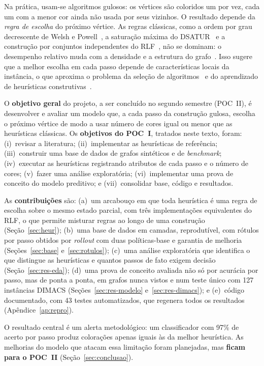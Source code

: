 \documentclass[conference,a4paper]{IEEEtran}
\begin{document}
Na prática, usam-se algoritmos gulosos: os vértices são coloridos um por vez, cada um com a
menor cor ainda não usada por seus vizinhos. O resultado depende da \emph{regra de escolha}
do próximo vértice. As regras clássicas, como a ordem por grau decrescente de Welsh e
Powell~\cite{welsh1967}, a saturação máxima do DSATUR~\cite{brelaz1979} e a construção por
conjuntos independentes do RLF~\cite{leighton1979}, não se dominam: o desempenho relativo muda
com a densidade e a estrutura do grafo~\cite{lewis2021}. Isso sugere que a melhor escolha em
cada passo depende de características locais da instância, o que aproxima o problema da
seleção de algoritmos~\cite{rice1976,musliu2013} e do aprendizado de heurísticas
construtivas~\cite{khalil2017,bengio2021}.

O \textbf{objetivo geral} do projeto, a ser concluído no segundo semestre (POC~II), é
desenvolver e avaliar um modelo que, a cada passo da construção gulosa, escolha o próximo
vértice de modo a usar número de cores igual ou menor que as heurísticas clássicas. Os
\textbf{objetivos do POC~I}, tratados neste texto, foram: (i)~revisar a literatura;
(ii)~implementar as heurísticas de referência; (iii)~construir uma base de dados de grafos
sintéticos e de \emph{benchmark}; (iv)~executar as heurísticas registrando atributos de cada
passo e o número de cores; (v)~fazer uma análise exploratória; (vi)~implementar uma prova de
conceito do modelo preditivo; e (vii)~consolidar base, código e resultados.

As \textbf{contribuições} são: (a)~um arcabouço em que toda heurística é uma regra de escolha
sobre o mesmo estado parcial, com três implementações equivalentes do RLF, o que permite
misturar regras ao longo de uma construção (Seção~\ref{sec:heur}); (b)~uma base de dados em
camadas, reprodutível, com rótulos por passo obtidos por \emph{rollout} com duas
políticas-base e garantia de melhoria (Seções~\ref{sec:base} e~\ref{sec:rotulos}); (c)~uma
análise exploratória que identifica o que distingue as heurísticas e quantos passos de fato
exigem decisão (Seção~\ref{sec:res-eda}); (d)~uma prova de conceito avaliada não só por
acurácia por passo, mas de ponta a ponta, em grafos nunca vistos e num teste único com 127
instâncias DIMACS (Seções~\ref{sec:res-modelo} e~\ref{sec:res-dimacs}); e (e)~código
documentado, com 43 testes automatizados, que regenera todos os resultados
(Apêndice~\ref{ap:repro}).

O resultado central é um alerta metodológico: um classificador com 97\% de acerto por passo
produz colorações apenas iguais às da melhor heurística. As melhorias do modelo que atacam
essa limitação foram planejadas, mas \textbf{ficam para o POC~II} (Seção~\ref{sec:conclusao}).
\end{document}
